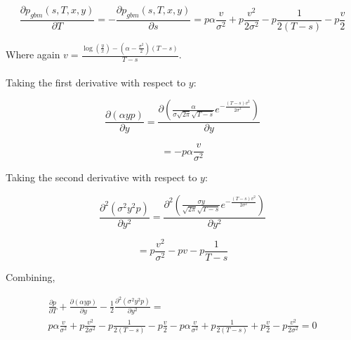 \documentclass{article}
\theoremstyle{definition}
\begin{document}
\[\frac{\partial p_{gbm}(s, T, x, y)}{\partial T}=  -\frac{\partial p_{gbm}(s, T, x, y)}{\partial s} = p \alpha \frac{v}{\sigma^2} + p\frac{v^2}{2\sigma^2}- p\frac{1}{2(T-s)}- p\frac{v}{2}    \]

Where again \(v=\frac{ \log\left(\frac{y}{x}\right) -\left(\alpha-\frac{\sigma^2}{2}\right)(T-s)}{T-s}\).
\\
\\
Taking the first derivative with respect to \(y\):

\[\frac{\partial \left(\alpha y p\right)}{\partial y}= \frac{\partial \left(\frac{\alpha}{\sigma \sqrt{2\pi} \sqrt{T-s} } e^{-\frac{(T-s)v^2}{2\sigma^2}}\right)}{\partial y} \]

\[=-p\alpha\frac{v }{\sigma^2}\]

Taking the second derivative with respect to \(y\):

\[\frac{\partial^2 \left(\sigma^2 y^2 p\right)}{\partial y^2}=\frac{\partial^2 \left(\frac{\sigma y }{\sqrt{2\pi} \sqrt{T-s} } e^{-\frac{(T-s)v^2}{2\sigma^2}}\right)}{\partial y^2} \]

\[=p\frac{v^2}{\sigma^2} -p v-p \frac{1}{T-s} \]

Combining, 

\begin{multline*} \frac{\partial p} {\partial T}+\frac{\partial \left(\alpha y p\right)}{\partial y}-\frac{1}{2} \frac{\partial^2 \left(\sigma^2 y^2 p\right)}{\partial y^2}= \\p \alpha \frac{v}{\sigma^2} + p\frac{v^2}{2\sigma^2}- p\frac{1}{2(T-s)}- p\frac{v}{2}- p\alpha\frac{v }{\sigma^2} +  p \frac{1}{2(T-s)} +p \frac{v}{2}- p\frac{v^2}{2\sigma^2}=0\end{multline*}
\end{document}
